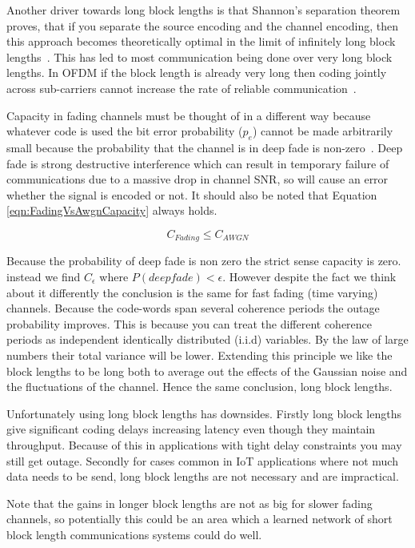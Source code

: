 \documentclass[12pt,onecolumn,letterpaper]{article}
\begin{document}
Another driver towards long block lengths is that Shannon's separation theorem proves, that if you separate the source encoding and the channel encoding, then this approach becomes theoretically optimal in the limit of infinitely long block lengths~\cite{ChannelEncodingOptimality}. This has led to most communication being done over very long block lengths. In OFDM if the block length is already very long then coding jointly across sub-carriers cannot increase the rate of reliable communication~\cite{WirelessTextbookC5}.

Capacity in fading channels must be thought of in a different way because whatever code is used the bit error probability ($p_e$) cannot be made arbitrarily small because the probability that the channel is in deep fade is non-zero~\cite{WirelessTextbookC5}. Deep fade is strong destructive interference which can result in temporary failure of communications due to a massive drop in channel SNR, so will cause an error whether the signal is encoded or not. It should also be noted that Equation \ref{eqn:FadingVsAwgnCapacity} always holds.

\begin{equation}
    C_{Fading} \leq C_{AWGN}
    \label{eqn:FadingVsAwgnCapacity}
\end{equation}

Because the probability of deep fade is non zero the strict sense capacity is zero. instead we find $C_{\epsilon}$ where $P(deep fade) < \epsilon$. However despite the fact we think about it differently the conclusion is the same for fast fading (time varying) channels. Because the code-words span several coherence periods the outage probability improves. This is because you can treat the different coherence periods as independent identically distributed (i.i.d) variables. By the law of large numbers their total variance will be lower. Extending this principle we like the block lengths to be long both to average out the effects of the Gaussian noise and the fluctuations of the channel. Hence the same conclusion, long block lengths.

Unfortunately using long block lengths has downsides. Firstly long block lengths give significant coding delays increasing latency even though they maintain throughput. Because of this in applications with tight delay constraints you may still get outage. Secondly for cases common in IoT applications where not much data needs to be send, long block lengths are not necessary and are impractical. 

Note that the gains in longer block lengths are not as big for slower fading channels, so potentially this could be an area which a learned network of short block length communications systems could do well.
\end{document}
